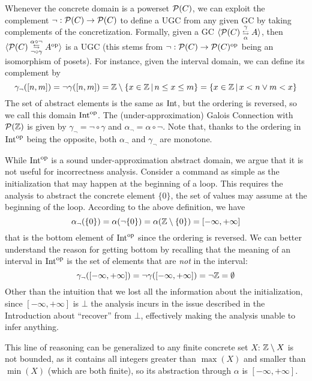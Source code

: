 \begin{example}\label{ex:uai:complement-domain}
	Whenever the concrete domain is a powerset $\mathcal{P}(C)$, we can exploit the complement $\lnot : \mathcal{P}(C) \rightarrow \mathcal{P}(C)$ to define a UGC from any given GC by taking complements of the concretization. Formally, given a GC $\langle \mathcal{P}(C) \mathrel{\substack{\gamma \\ \leftrightarrows \\ \alpha}} A\rangle$, then $\langle \mathcal{P}(C) \mathrel{\substack{\alpha \circ \lnot \\ \leftrightarrows \\ \lnot \circ \gamma}} A^{\text{op}}\rangle$ is a UGC (this stems from $\lnot : \mathcal{P}(C) \rightarrow \mathcal{P}(C)^{\text{op}}$ being an isomorphism of posets).
	For instance, given the interval domain, we can define its complement by
	\[
	\gamma_{\lnot}([n, m]) = \lnot \gamma([n, m]) = \mathbb{Z} \setminus \{ x \in  \mathbb{Z} \,\vert\, n \le x \le m \} = \{ x \in \mathbb{Z} \,\vert\, x < n \lor m < x \}
	\]
	The set of abstract elements is the same as $\text{Int}$, but the ordering is reversed, so we call this domain $\text{Int}^{\text{op}}$. The (under-approximation) Galois Connection with $\mathcal{P}(\mathbb{Z})$ is given by $\gamma_{\lnot} = \lnot \circ \gamma$ and $\alpha_{\lnot} = \alpha \circ \lnot$. Note that, thanks to the ordering in $\text{Int}^{\text{op}}$ being the opposite, both $\alpha_{\lnot}$ and $\gamma_{\lnot}$ are monotone.

	While $\text{Int}^{\text{op}}$ is a sound under-approximation abstract domain, we argue that it is not useful for incorrectness analysis. Consider a command as simple as the initialization  that may happen at the beginning of a loop. This requires the analysis to abstract the concrete element $\{ 0 \}$, the set of values  may assume at the beginning of the loop. According to the above definition, we have
	\[
	\alpha_{\lnot}(\{ 0 \}) = \alpha(\lnot \{ 0 \}) = \alpha(\mathbb{Z} \setminus \{ 0 \}) = [-\infty, +\infty]
	\]
	that is the bottom element of $\text{Int}^{\text{op}}$ since the ordering is reversed. We can better understand the reason for getting bottom by recalling that the meaning of an interval in $\text{Int}^{\text{op}}$ is the set of elements that are \emph{not} in the interval:
	\[
	\gamma_{\lnot}([-\infty, +\infty]) = \lnot \gamma([-\infty, +\infty]) = \lnot \mathbb{Z} = \emptyset
	\]
	Other than the intuition that we lost all the information about the initialization, since $[-\infty, +\infty]$ is $\bot$ the analysis incurs in the issue described in the Introduction about ``recover'' from $\bot$, effectively making the analysis unable to infer anything.

	This line of reasoning can be generalized to any finite concrete set $X$: $\mathbb{Z} \setminus X$ is not bounded, as it contains all integers greater than $\max(X)$ and smaller than $\min(X)$ (which are both finite), so its abstraction through $\alpha$ is $[-\infty, +\infty]$.
\end{example}

